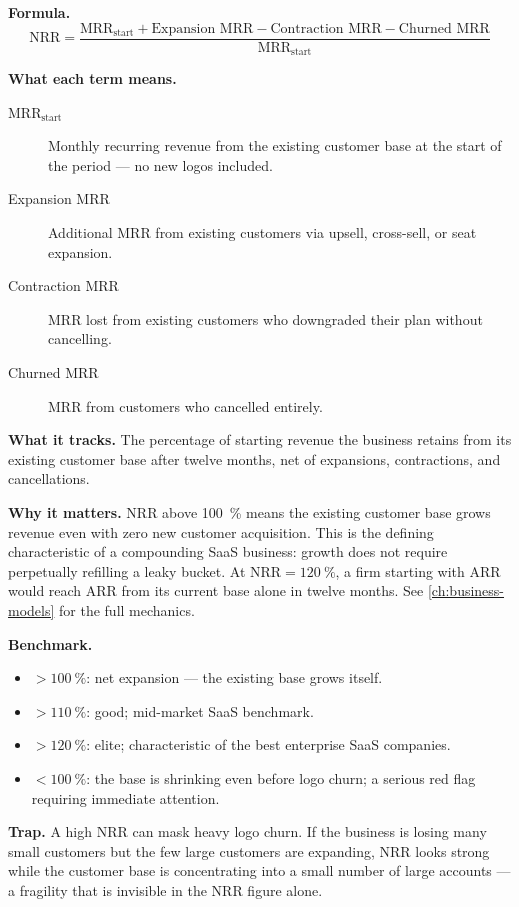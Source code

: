 \textbf{Formula.}
\[
  \mathrm{NRR} = \frac{\text{MRR}_\text{start} + \text{Expansion MRR} - \text{Contraction MRR} - \text{Churned MRR}}{\text{MRR}_\text{start}}
\]

\textbf{What each term means.}
\begin{description}
  \item[MRR$_\text{start}$] Monthly recurring revenue from the existing customer base at the
    start of the period --- no new logos included.
  \item[Expansion MRR] Additional MRR from existing customers via upsell, cross-sell, or
    seat expansion.
  \item[Contraction MRR] MRR lost from existing customers who downgraded their plan without
    cancelling.
  \item[Churned MRR] MRR from customers who cancelled entirely.
\end{description}

\textbf{What it tracks.} The percentage of starting revenue the business retains from its
existing customer base after twelve months, net of expansions, contractions, and
cancellations.

\textbf{Why it matters.} NRR above \qty{100}{\percent} means the existing customer base
grows revenue even with zero new customer acquisition. This is the defining characteristic
of a compounding SaaS business: growth does not require perpetually refilling a leaky bucket.
At $\mathrm{NRR} = \qty{120}{\percent}$, a firm starting with  ARR would
reach  ARR from its current base alone in twelve months. See
\cref{ch:business-models} for the full mechanics.

\textbf{Benchmark.}
\begin{itemize}
  \item $>\qty{100}{\percent}$: net expansion --- the existing base grows itself.
  \item $>\qty{110}{\percent}$: good; mid-market SaaS benchmark.
  \item $>\qty{120}{\percent}$: elite; characteristic of the best enterprise SaaS companies.
  \item $<\qty{100}{\percent}$: the base is shrinking even before logo churn; a serious
    red flag requiring immediate attention.
\end{itemize}

\textbf{Trap.} A high NRR can mask heavy logo churn. If the business is losing many small
customers but the few large customers are expanding, NRR looks strong while the customer base
is concentrating into a small number of large accounts --- a fragility that is invisible in
the NRR figure alone.

